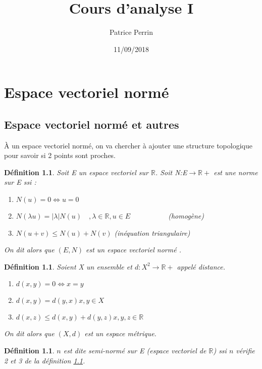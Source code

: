 \documentclass[a4paper, oneside]{report}
\theoremstyle{break}
\newtheorem{defi}[thm]{Définition}
\newcommand{\R}{\mathbb{R}}
\newcommand{\ev}{espace vectoriel }
\newcommand{\evn}{espace vectoriel normé }
\begin{document}
\title{Cours d'analyse I}
\date{11/09/2018}
\author{Patrice Perrin}
\maketitle

\tableofcontents{}
\chapter{Espace vectoriel normé}

\section{Espace vectoriel normé et autres}

À un \ev normé, on va chercher à ajouter une structure topologique pour savoir si 2 points sont proches.

\begin{defi}
Soit E un \ev sur $\R$. Soit N:E$\rightarrow \R+$ est une norme sur E ssi :

\begin{enumerate}
\item $N(u)=0 \Leftrightarrow u=0$
\item $N(\lambda u)=|\lambda| N(u)\hspace{1em}, \lambda\in \R, u\in E \hspace{5em}$ (homogène)
\item $N(u+v)\leq N(u)+N(v)$ \hspace{5em} (inéquation triangulaire)
\end{enumerate}
On dit alors que $(E, N)$ est un \evn.
\end{defi}

\begin{defi}
\label{def-evm}
Soient X un ensemble et $d:X^2\rightarrow \R+$ appelé distance.

\begin{enumerate}
\item $d(x,y) = 0 \Leftrightarrow x=y$
\item $d(x,y)=d(y,x)$\hspace{1em}$x,y\in X$
\item $d(x,z)\leq d(x,y)+d(y,z)$\hspace{1em}$x,y,z\in \R$
\end{enumerate}
On dit alors que $(X,d)$ est un espace métrique.
\end{defi}

\begin{defi}
$n$ est dite semi-normé sur E (\ev de $\R$) ssi $n$ vérifie 2 et 3 de la définition \ref{def-evm}.
\end{defi}
\end{document}
